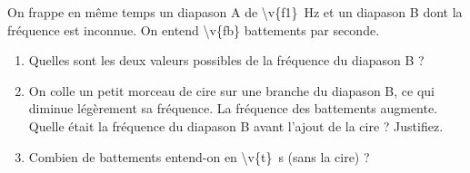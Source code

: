 On frappe en même temps un diapason A de \qty{\v{f1}}{Hz} et un diapason B dont la fréquence est inconnue. On entend \num{\v{fb}} battements par seconde.

\begin{enumerate}[label=\alph*)]
    \item Quelles sont les deux valeurs possibles de la fréquence du diapason B ?
    \item On colle un petit morceau de cire sur une branche du diapason B, ce qui diminue légèrement sa fréquence. La fréquence des battements augmente. Quelle était la fréquence du diapason B avant l'ajout de la cire ? Justifiez.
    \item Combien de battements entend-on en \qty{\v{t}}{s} (sans la cire) ?
\end{enumerate}
